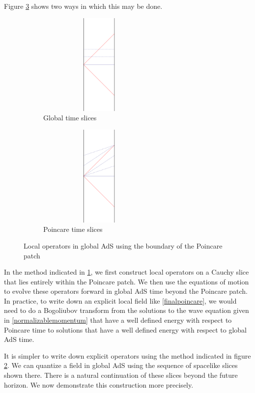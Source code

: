 Figure \ref{poincaretoglobal} shows two ways in which this may be done. 
\begin{figure}[!h]
\begin{center}
\begin{subfigure}[b]{6cm}
\includegraphics[width=6cm, height=5cm]{pointoglobal1}
\caption{Global time slices \label{globaltimecoord}}
\end{subfigure}
\qquad
\qquad
\begin{subfigure}[b]{6cm}
\includegraphics[width=6cm, height=5cm]{pointoglobal2}
\caption{Poincare time slices \label{pointimecoord}}
\end{subfigure}
\caption{Local operators in global AdS using the boundary of the Poincare patch \label{poincaretoglobal}}
\end{center}
\end{figure}
In the method indicated in \ref{globaltimecoord}, we first construct local operators on a Cauchy slice that lies entirely within the Poincare patch. We then use the equations of motion to evolve these operators forward in global AdS time beyond the Poincare patch. In practice, to write down an explicit local field like \eqref{finalpoincare}, we would need to do a Bogoliubov transform from the solutions to the wave equation given in \eqref{normalizablemomentum} that have a well defined energy with respect to Poincare time to solutions that have a well defined energy with respect to global AdS time. 

It is simpler to write down explicit operators using the method indicated
in figure \ref{pointimecoord}. We can quantize a field in global AdS
using the sequence of spacelike slices shown there. There is a natural
continuation of these slices beyond the future horizon. We now demonstrate this construction more precisely.

